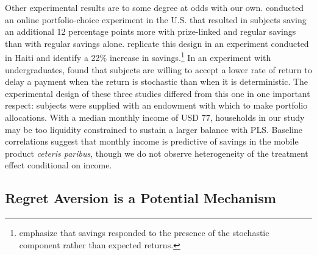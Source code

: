 \documentclass[11pt]{article}
\begin{document}
		Other experimental results are to some degree at odds with our own. \textcite{atalay_savings_2014} conducted an online portfolio-choice experiment in the U.S. that resulted in subjects saving an additional 12 percentage points more with prize-linked and regular savings than with regular savings alone. \textcite{dizon_leveraging_2016} replicate this design in an experiment conducted in Haiti and identify a 22\% increase in savings.\footnote{\textcite{dizon_leveraging_2016} emphasize that savings responded to the presence of the stochastic component rather than expected returns.} In an experiment with undergraduates, \textcite{filiz-ozbay_lottery_2015} found that subjects are willing to accept a lower rate of return to delay a payment when the return is stochastic than when it is deterministic. The experimental design of these three studies differed from this one in one important respect: subjects were supplied with an endowment with which to make portfolio allocations. With a median monthly income of USD 77, households in our study may be too liquidity constrained to sustain a larger balance with PLS. Baseline correlations suggest that monthly income is predictive of savings in the mobile product \textit{ceteris paribus}, though we do not observe heterogeneity of the treatment effect conditional on income.



	\subsection{Regret Aversion is a Potential Mechanism}
\end{document}
